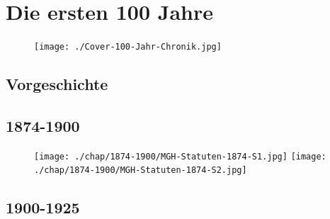 \documentclass[openany]{book}
\begin{document}
\chapter{Die ersten 100 Jahre}
\begin{figure}[ht]
    \texttt{[image: ./Cover-100-Jahr-Chronik.jpg]}
\end{figure}
\section{Vorgeschichte}

\clearpage


\section{1874-1900}

\begin{figure}[ht]
    \texttt{[image: ./chap/1874-1900/MGH-Statuten-1874-S1.jpg]}
    \texttt{[image: ./chap/1874-1900/MGH-Statuten-1874-S2.jpg]}
    \label{fig:Statuten-1874}
\end{figure}


\clearpage

\section{1900-1925}
\end{document}
